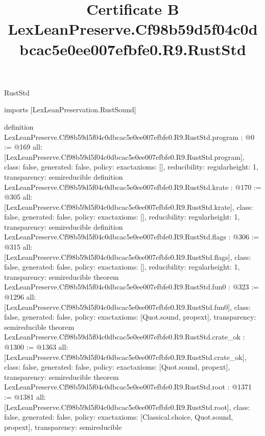 \begin{lexlean}{RustStd}
\title{Certificate B LexLeanPreserve.Cf98b59d5f04c0dbcac5e0ee007efbfe0.R9.RustStd}
\begin{coremodule}
imports [LexLeanPreservation.RustSound]

definition LexLeanPreserve.Cf98b59d5f04c0dbcac5e0ee007efbfe0.R9.RustStd.program : @0 := @169 {
  all: [LexLeanPreserve.Cf98b59d5f04c0dbcac5e0ee007efbfe0.R9.RustStd.program],
  class: false,
  generated: false,
  policy: exact{axioms: []},
  reducibility: regular{height: 1},
  transparency: semireducible
}
definition LexLeanPreserve.Cf98b59d5f04c0dbcac5e0ee007efbfe0.R9.RustStd.krate : @170 := @305 {
  all: [LexLeanPreserve.Cf98b59d5f04c0dbcac5e0ee007efbfe0.R9.RustStd.krate],
  class: false,
  generated: false,
  policy: exact{axioms: []},
  reducibility: regular{height: 1},
  transparency: semireducible
}
definition LexLeanPreserve.Cf98b59d5f04c0dbcac5e0ee007efbfe0.R9.RustStd.flags : @306 := @315 {
  all: [LexLeanPreserve.Cf98b59d5f04c0dbcac5e0ee007efbfe0.R9.RustStd.flags],
  class: false,
  generated: false,
  policy: exact{axioms: []},
  reducibility: regular{height: 1},
  transparency: semireducible
}
theorem LexLeanPreserve.Cf98b59d5f04c0dbcac5e0ee007efbfe0.R9.RustStd.fun0 : @323 := @1296 {
  all: [LexLeanPreserve.Cf98b59d5f04c0dbcac5e0ee007efbfe0.R9.RustStd.fun0],
  class: false,
  generated: false,
  policy: exact{axioms: [Quot.sound, propext]},
  transparency: semireducible
}
theorem LexLeanPreserve.Cf98b59d5f04c0dbcac5e0ee007efbfe0.R9.RustStd.crate_ok : @1300 := @1363 {
  all: [LexLeanPreserve.Cf98b59d5f04c0dbcac5e0ee007efbfe0.R9.RustStd.crate_ok],
  class: false,
  generated: false,
  policy: exact{axioms: [Quot.sound, propext]},
  transparency: semireducible
}
theorem LexLeanPreserve.Cf98b59d5f04c0dbcac5e0ee007efbfe0.R9.RustStd.root : @1371 := @1381 {
  all: [LexLeanPreserve.Cf98b59d5f04c0dbcac5e0ee007efbfe0.R9.RustStd.root],
  class: false,
  generated: false,
  policy: exact{axioms: [Classical.choice, Quot.sound, propext]},
  transparency: semireducible
}


\end{coremodule}
\end{lexlean}
